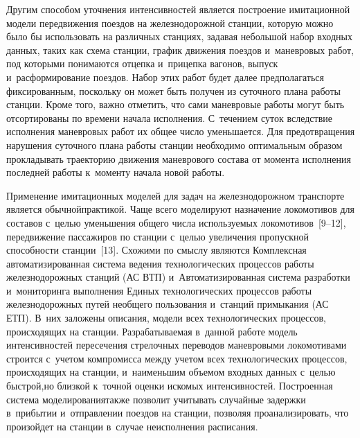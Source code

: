 \begin{multicols}{2}
Другим способом уточнения 
интенсивностей является по\-стро\-ение имитационной модели передвижения 
поездов на железнодорожной станции, которую можно было бы использовать на 
различных станциях, задавая небольшой набор входных данных, таких как схема 
станции, график движения поездов и~маневровых работ, под которыми 
понимаются отцепка и~прицепка вагонов, выпуск и~расформирование поездов. 
Набор этих работ будет далее предполагаться фиксированным, поскольку он 
может быть получен из суточного плана работы станции. Кроме того, важно 
отметить, что сами маневровые работы могут быть отсортированы по времени 
начала исполнения. С~течением суток вследствие исполнения маневровых работ 
их общее число уменьшается. Для предотвращения нарушения суточного плана 
работы станции необходимо оптимальным образом прокладывать траекторию 
движения маневрового состава от момента исполнения последней работы 
к~моменту начала новой работы.
{

}
      
      
      Применение имитационных моделей для задач на железнодорожном 
транспорте является обычной\linebreak практикой. Чаще всего моделируют назначение\linebreak 
локомотивов для составов с~целью уменьшения общего числа используемых  
локомотивов~[9--12], передвижение пассажиров по станции с~целью увеличения 
пропускной способности станции~[13]. Схожими по смыслу являются 
Комплексная автоматизированная система ведения технологических процессов 
работы железнодорожных станций (АС ВТП) и~Автоматизированная система 
разработки и~мониторинга выполнения Единых технологических процессов 
работы железнодорожных путей необщего пользования и~станций примыкания 
(АС ЕТП). В~них заложены описания, модели всех технологических процессов, 
происходящих на станции. Разрабатываемая в~данной работе модель 
интенсивностей пересечения стрелочных переводов маневровыми локомотивами 
строится с~учетом компромисса между учетом всех технологических процессов, 
происходящих на станции, и~наименьшим объемом входных данных с~целью 
быстрой,\linebreak но близкой к~точной оценки искомых интенсивностей. Построенная 
система моделирования\linebreak также позволит учитывать случайные задержки 
в~прибытии и~отправлении поездов на станции, позволяя проанализировать, что 
произойдет на станции в~случае неисполнения расписания.
      

\end{multicols}

